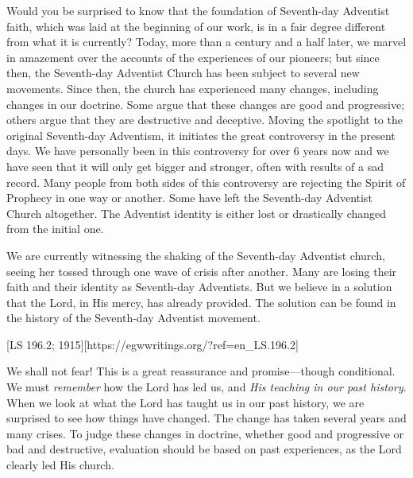 Would you be surprised to know that the foundation of Seventh-day Adventist faith, which was laid at the beginning of our work, is in a fair degree different from what it is currently? Today, more than a century and a half later, we marvel in amazement over the accounts of the experiences of our pioneers; but since then, the Seventh-day Adventist Church has been subject to several new movements. Since then, the church has experienced many changes, including changes in our doctrine. Some argue that these changes are good and progressive; others argue that they are destructive and deceptive. Moving the spotlight to the original Seventh-day Adventism, it initiates the great controversy in the present days. We have personally been in this controversy for over 6 years now and we have seen that it will only get bigger and stronger, often with results of a sad record. Many people from both sides of this controversy are rejecting the Spirit of Prophecy in one way or another. Some have left the Seventh-day Adventist Church altogether. The Adventist identity is either lost or drastically changed from the initial one.

We are currently witnessing the shaking of the Seventh-day Adventist church, seeing her tossed through one wave of crisis after another. Many are losing their faith and their identity as Seventh-day Adventists. But we believe in a solution that the Lord, in His mercy, has already provided. The solution can be found in the history of the Seventh-day Adventist movement.

[LS 196.2; 1915][https://egwwritings.org/?ref=en\_LS.196.2]

We shall not fear! This is a great reassurance and promise—though conditional. We must \textit{remember} how the Lord has led us, and \textit{His teaching in our past history}. When we look at what the Lord has taught us in our past history, we are surprised to see how things have changed. The change has taken several years and many crises. To judge these changes in doctrine, whether good and progressive or bad and destructive, evaluation should be based on past experiences, as the Lord clearly led His church.

